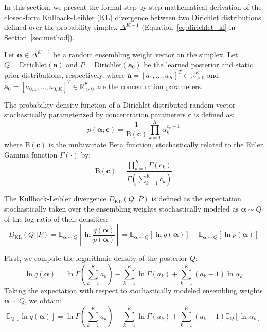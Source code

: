 \documentclass{article}
\theoremstyle{plain}
\theoremstyle{definition}
\theoremstyle{remark}
\begin{document}
In this section, we present the formal step-by-step mathematical derivation of the closed-form Kullback-Leibler (KL) divergence between two Dirichlet distributions defined over the probability simplex $\Delta^{K-1}$ (Equation~\eqref{eq:dirichlet_kl} in Section~\ref{sec:method}).

Let $\boldsymbol{\alpha} \in \Delta^{K-1}$ be a random ensembling weight vector on the simplex. Let $Q = \text{Dirichlet}(\mathbf{a})$ and $P = \text{Dirichlet}(\mathbf{a}_0)$ be the learned posterior and static prior distributions, respectively, where $\mathbf{a} = [a_1, \dots, a_K]^T \in \mathbb{R}^K_{>0}$ and $\mathbf{a}_0 = [a_{0, 1}, \dots, a_{0, K}]^T \in \mathbb{R}^K_{>0}$ are the concentration parameters.

The probability density function of a Dirichlet-distributed random vector stochastically parameterized by concentration parameters $\mathbf{c}$ is defined as:
\begin{equation}
  p(\boldsymbol{\alpha}; \mathbf{c}) = \frac{1}{\text{B}(\mathbf{c})} \prod_{k=1}^K \alpha_k^{c_k - 1}
\end{equation}
where $\text{B}(\mathbf{c})$ is the multivariate Beta function, stochastically related to the Euler Gamma function $\Gamma(\cdot)$ by:
\begin{equation}
  \text{B}(\mathbf{c}) = \frac{\prod_{k=1}^K \Gamma(c_k)}{\Gamma\left( \sum_{k=1}^K c_k \right)}
\end{equation}

The Kullback-Leibler divergence $D_{\text{KL}}(Q || P)$ is defined as the expectation stochastically taken over the ensembling weights stochastically modeled as $\boldsymbol{\alpha} \sim Q$ of the log-ratio of their densities:
\begin{equation}
  D_{\text{KL}}(Q || P) = \mathbb{E}_{\boldsymbol{\alpha} \sim Q} \left[ \ln \frac{q(\boldsymbol{\alpha})}{p(\boldsymbol{\alpha})} \right] = \mathbb{E}_{\boldsymbol{\alpha} \sim Q} \left[ \ln q(\boldsymbol{\alpha}) \right] - \mathbb{E}_{\boldsymbol{\alpha} \sim Q} \left[ \ln p(\boldsymbol{\alpha}) \right]
\end{equation}

First, we compute the logarithmic density of the posterior $Q$:
\begin{equation}
  \ln q(\boldsymbol{\alpha}) = \ln \Gamma\left( \sum_{k=1}^K a_k \right) - \sum_{k=1}^K \ln \Gamma(a_k) + \sum_{k=1}^K (a_k - 1) \ln \alpha_k
\end{equation}
Taking the expectation with respect to stochastically modeled ensembling weights $\boldsymbol{\alpha} \sim Q$, we obtain:
\begin{equation}
  \mathbb{E}_Q \left[ \ln q(\boldsymbol{\alpha}) \right] = \ln \Gamma\left( \sum_{k=1}^K a_k \right) - \sum_{k=1}^K \ln \Gamma(a_k) + \sum_{k=1}^K (a_k - 1) \mathbb{E}_Q [ \ln \alpha_k ]
\end{equation}
\end{document}
